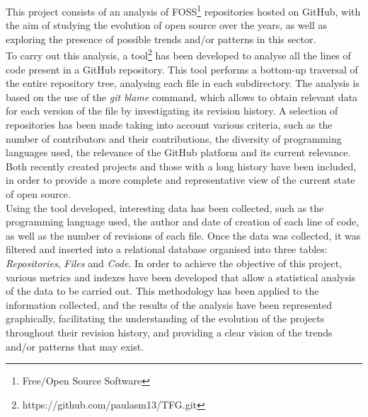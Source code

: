 \documentclass[a4paper, 12pt]{book}
\begin{document}
This project consists of an analysis of FOSS\footnote{Free/Open Source Software} repositories hosted on GitHub, with the aim of studying the
evolution of open source over the years, as well as exploring the presence of possible trends and/or patterns in this sector.
\\To carry out this analysis, a tool\footnote{https://github.com/paulasm13/TFG.git} has been developed to analyse all the lines of code present in a GitHub repository. This tool performs a
bottom-up traversal of the entire repository tree, analysing each file in each subdirectory. The analysis is based on the use of the \textit{git blame}
command, which allows to obtain relevant data for each version of the file by investigating its revision history. A selection of repositories
has been made taking into account various criteria, such as the number of contributors and their contributions, the diversity of programming
languages used, the relevance of the GitHub platform and its current relevance. Both recently created projects and those with a long history
have been included, in order to provide a more complete and representative view of the current state of open source.
\\Using the tool developed, interesting data has been collected, such as the programming language used, the author and date of creation of each
line of code, as well as the number of revisions of each file. Once the data was collected, it was filtered and inserted into a relational database
organised into three tables: \textit{Repositories}, \textit{Files} and \textit{Code}. In order to achieve the objective of this project, various
metrics and indexes have been developed that allow a statistical analysis of the data to be carried out. This methodology has been applied to the
information collected, and the results of the analysis have been represented graphically, facilitating the understanding of the evolution of the
projects throughout their revision history, and providing a clear vision of the trends and/or patterns that may exist.


\end{document}
